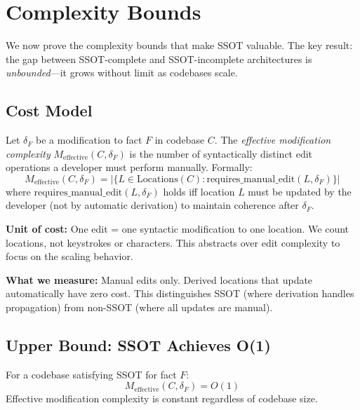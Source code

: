 \section{Complexity Bounds}\label{sec:bounds}

We now prove the complexity bounds that make SSOT valuable. The key result: the gap between SSOT-complete and SSOT-incomplete architectures is \emph{unbounded}---it grows without limit as codebases scale.

\subsection{Cost Model}\label{sec:cost-model}

\begin{definition}\label{def:cost-model}
Let $\delta_F$ be a modification to fact $F$ in codebase $C$. The \emph{effective modification complexity} $M_{\text{effective}}(C, \delta_F)$ is the number of syntactically distinct edit operations a developer must perform manually. Formally:
\[
M_{\text{effective}}(C, \delta_F) = |\{L \in \text{Locations}(C) : \text{requires\_manual\_edit}(L, \delta_F)\}|
\]
where $\text{requires\_manual\_edit}(L, \delta_F)$ holds iff location $L$ must be updated by the developer (not by automatic derivation) to maintain coherence after $\delta_F$.
\end{definition}

\textbf{Unit of cost:} One edit = one syntactic modification to one location. We count locations, not keystrokes or characters. This abstracts over edit complexity to focus on the scaling behavior.

\textbf{What we measure:} Manual edits only. Derived locations that update automatically have zero cost. This distinguishes SSOT (where derivation handles propagation) from non-SSOT (where all updates are manual).

\subsection{Upper Bound: SSOT Achieves O(1)}\label{sec:upper-bound}

\begin{theorem}\label{thm:upper-bound}
For a codebase satisfying SSOT for fact $F$:
\[
M_{\text{effective}}(C, \delta_F) = O(1)
\]
Effective modification complexity is constant regardless of codebase size.
\end{theorem}

